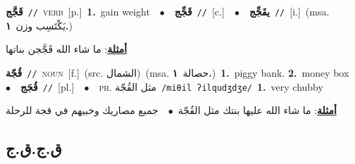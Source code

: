 \documentclass[10pt,a4paper,twoside]{article} %
\begin{document}
\begin{multicols}{2}
{\setlength\topsep{0pt}\textbf{\foreignlanguage{arabic}{قَجَّج}}\ {\color{gray}\texttt{//}\color{black}}\ \textsc{verb}\ [p.]\ \textbf{1.}~gain weight\ \ $\bullet$\ \ \setlength\topsep{0pt}\textbf{\foreignlanguage{arabic}{قَجِّج}}\ {\color{gray}\texttt{//}\color{black}}\ [c.]\ \ $\bullet$\ \ \setlength\topsep{0pt}\textbf{\foreignlanguage{arabic}{يقَجِّج}}\ {\color{gray}\texttt{//}\color{black}}\ [i.]\ \color{gray}(msa. \foreignlanguage{arabic}{يَكْتَسِب وزن}~\foreignlanguage{arabic}{\textbf{١.}})\color{black}\  \begin{flushright}\color{gray}\foreignlanguage{arabic}{\textbf{\underline{\foreignlanguage{arabic}{أمثلة}}}: ما شاء الله قَجَّجن بناتها}\end{flushright}\color{black}} \vspace{2mm}

{\setlength\topsep{0pt}\textbf{\foreignlanguage{arabic}{قُجّة}}\ {\color{gray}\texttt{//}\color{black}}\ \textsc{noun}\ [f.]\ (src. \color{gray}\foreignlanguage{arabic}{الشمال}\color{black})\ \color{gray}(msa. \foreignlanguage{arabic}{حصالة}~\foreignlanguage{arabic}{\textbf{١.}})\color{black}\ \textbf{1.}~piggy bank.  \textbf{2.}~money box\ \ $\bullet$\ \ \setlength\topsep{0pt}\textbf{\foreignlanguage{arabic}{قُجَج}}\ {\color{gray}\texttt{//}\color{black}}\ [pl.]\ \ $\bullet$\ \ \textsc{ph.} \color{gray} \foreignlanguage{arabic}{مثل القُجّة}\color{black}\ {\color{gray}\texttt{/{\sffamily miθil ʔilqudʒdʒe}/}\color{black}}\ \textbf{1.}~very chubby\  \begin{flushright}\color{gray}\foreignlanguage{arabic}{\textbf{\underline{\foreignlanguage{arabic}{أمثلة}}}: ما شاء الله عليها بنتك مثل القُجّة\ $\bullet$\ \  جميع مصاريك وخبيهم في قجة للرحلة}\end{flushright}\color{black}} \vspace{2mm}

\vspace{-3mm}
\subsection*{\color{blue}\foreignlanguage{arabic}{ق.ج.ق.ج}\color{blue}{}} 


\end{multicols}
\end{document}
